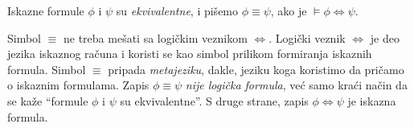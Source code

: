 \begin{DEF}
  Iskazne formule $\phi$ i $\psi$ su \emph{ekvivalentne}, i pi\v semo $\phi \equiv \psi$, ako je
  $\vDash \phi \Leftrightarrow \psi$.
\end{DEF}

Simbol $\equiv$ ne treba me\v sati sa logi\v ckim veznikom $\Leftrightarrow$. Logi\v cki veznik
$\Leftrightarrow$ je deo jezika iskaznog ra\v cuna i koristi se kao simbol prilikom formiranja iskaznih formula.
Simbol $\equiv$ pripada \emph{metajeziku}, dakle, jeziku koga koristimo da pri\v camo o iskaznim formulama. Zapis
$\phi \equiv \psi$ \emph{nije logi\v cka formula}, ve\'c samo kra\'ci na\v cin da se ka\v ze
\enquote{formule $\phi$ i $\psi$ su ekvivalentne}. S druge strane, zapis $\phi \Leftrightarrow \psi$
je iskazna formula.

% 
% 
% 
% 
